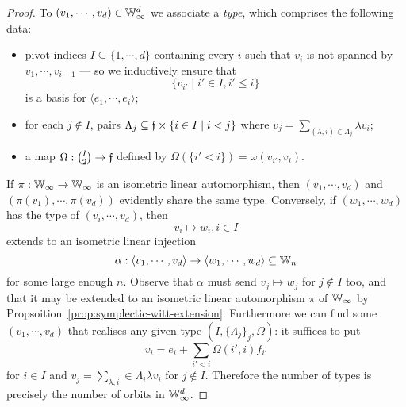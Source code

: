 \begin{proof}
    To $(v_1, \cdots, v_d) \in \mathbb{W}_\infty^d$ we associate a \emph{type}, 
    which comprises the following data:
    \begin{itemize}
        \item 
        pivot indices $I \subseteq \{1, \cdots, d\}$ containing every $i$ 
        such that $v_i$ is not spanned by $v_1, \cdots, v_{i-1}$
        --- so we inductively ensure that $$\{v_{i'} \mid i' \in I, i' \leq i\}$$ is a basis for $\langle e_1, \cdots, e_i \rangle$;

        \item 
        for each $j \not\in I$, pairs $\Lambda_j \subseteq \mathfrak{f} \times \{i \in I \mid i < j\}$
        where $v_j = \sum_{(\lambda, i) \in \Lambda_j} \lambda v_i$;

        \item 
        a map $\Omega : \binom{I}{2} \to \mathfrak{f}$ defined by $\Omega(\{i' < i\}) = \omega(v_{i'}, v_{i})$.
    \end{itemize}
    If $\pi : \mathbb{W}_\infty \to \mathbb{W}_\infty$ is an isometric linear automorphism,
    then $(v_1, \cdots, v_d)$ and $(\pi(v_1), \cdots, \pi(v_d))$ evidently share the same type.
    Conversely, if $(w_1, \cdots, w_d)$ has the type of $(v_i, \cdots, v_d)$,
    then \[
        v_i \mapsto w_i, i \in I
    \] extends to an isometric linear injection 
    \[
        \alpha : \langle v_1, \cdots, v_d \rangle 
        \to \langle w_1, \cdots, w_d \rangle 
        \subseteq \mathbb{W}_n
    \]
    for some large enough $n$.
    Observe that $\alpha$ must send $v_j \mapsto w_j$ for $j \not\in I$ too,
    and that it may be extended to an isometric linear automorphism $\pi$ of $\mathbb{W}_\infty$ by Propsoition~\ref{prop:symplectic-witt-extension}.
    Furthermore we can find some $(v_1, \cdots, v_d)$ that realises any given type $(I, \{\Lambda_j\}_j, \Omega)$:
    it suffices to put
    \[
        v_i = e_i + \sum_{i' < i} \Omega(i', i) f_{i'}
    \]
    for $i \in I$ and $v_j = \sum_{\lambda, i} \in \Lambda_i \lambda v_i$ for $j \not\in I$.
    Therefore the number of types is precisely the number of orbits in $\mathbb{W}_\infty^d$.


\end{proof}
